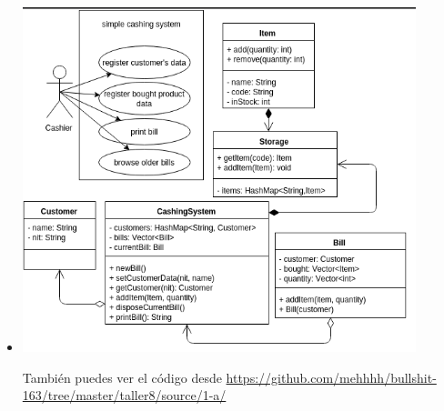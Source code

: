 \begin{itemize}

\item \includegraphics[width=0.9\textwidth]{img/1-a.png}

También puedes ver el código desde \url{https://github.com/mehhhh/bullshit-163/tree/master/taller8/source/1-a/}










\end{itemize}
